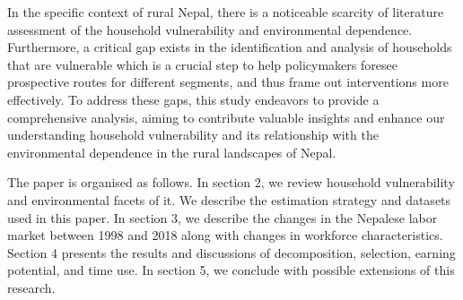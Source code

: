 In the specific context of rural Nepal, there is a noticeable scarcity of literature assessment of the household vulnerability and environmental dependence. Furthermore, a critical gap exists in the identification and analysis of households that are vulnerable which is a crucial step to help policymakers foresee prospective routes for different segments, and thus frame out interventions more effectively. To address these gaps, this study endeavors to provide a comprehensive analysis, aiming to contribute valuable insights and enhance our understanding household vulnerability and its relationship with the environmental dependence in the rural landscapes of Nepal.\par

The paper is organised as follows. In section 2, we review household vulnerability and environmental facets of it. We describe the estimation strategy and datasets used in this paper. In section 3, we describe the changes in the Nepalese labor market between 1998 and 2018 along with changes in workforce characteristics. Section 4 presents the results and discussions of decomposition, selection, earning potential, and time use. In section 5, we conclude with possible extensions of this research.\par                                                                                                                                                                                                                                                        

